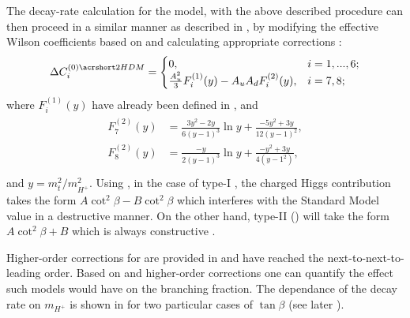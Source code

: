 The decay-rate calculation for the \TwoHDM model, with the above described procedure can then proceed in a similar manner as described in , by modifying the effective Wilson coefficients based on  and calculating appropriate corrections \cite{Ciuchini:1997xe}:
\begin{equation}\label{eq:delta_wilson_2hdm}
    \Delta C_i^{(0)\TwoHDM} = 
    \begin{cases}
        0, & i=1,...,6;\\
        \frac{A_u^2}{3}F_i^{(1)}(y) - A_uA_dF_i^{(2)}(y), & i=7,8;\\
    \end{cases}
\end{equation}
where $F_i^{(1)}(y)$ have already been defined in , and
\begin{align}
    \begin{split}
    F_7^{(2)}(y) &= \frac{3y^2-2y}{6(y-1)^3}\ln y + \frac{-5y^2+3y}{12(y-1)^2},\\
    F_8^{(2)}(y) &= \frac{-y}{2(y-1)^3}\ln y + \frac{-y^2+3y}{4(y-1^2)},\\
    \end{split}
\end{align}
and $y = m_t^2/m_{H^+}^2$.
Using , in the case of type-I \TwoHDM, the charged Higgs contribution takes the form $A\cot^2\beta-B\cot^2\beta$ which interferes with the Standard Model value in a destructive manner.
On the other hand, type-II \TwoHDM () will take the form $A\cot^2\beta+B$ which is always constructive \cite{Misiak:2017bgg}.

Higher-order corrections for \TwoHDM are provided in \cite{Ciuchini:1997xe,Hermann:2012fc} and have reached the next-to-next-to-leading order.
Based on  and higher-order corrections one can quantify the effect such models would have on the \BtoXsgamma branching fraction.
The dependance of the \BtoXsgamma decay rate on $m_{H^+}$ is shown in  for two particular cases of $\tan\beta$ (see later ).

